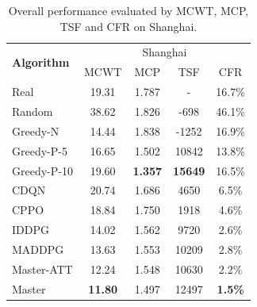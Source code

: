 \documentclass[sigconf]{acmart}
\newcommand{\beijing}{{\sc Beijing}\xspace}
\newcommand{\shanghai}{{\sc Shanghai}\xspace}
\newcommand{\stddpg}{{\sc Master}\xspace}
\begin{document}
\begin{table}[htb]
	\centering
	\caption{Overall performance evaluated by MCWT, MCP, TSF and CFR on \shanghai.}
	\vspace{-2mm}
	\begin{tabular}{lcccc}
		\toprule[0.8pt]
		\multirow{2}{*}{\textbf{Algorithm}} & \multicolumn{4}{c}{\shanghai} \\ \cline{2-5}
		& MCWT & MCP & TSF & CFR \\ 
		\midrule[0.5pt]
		Real &   19.31 & 1.787 & - & 16.7\% \\
		Random &   38.62 & 1.826 & -698 & 46.1\% \\
		Greedy-N &  14.44 & 1.838 & -1252 & 16.9\%  \\
		Greedy-P-5 &  16.65 & 1.502 & 10842 & 13.8\% \\
		Greedy-P-10 & 19.60 & \textbf{1.357} & \textbf{15649} & 16.5\% \\
		CDQN & 20.74 & 1.686 & 4650 & 6.5\% \\
		CPPO & 18.84 & 1.750 & 1918 & 4.6\%\\
		IDDPG & 14.02 & 1.562 & 9720 & 2.6\%\\
		MADDPG & 13.63 & 1.553 & 10209 & 2.8\%\\
        \midrule[0.5pt]
		\stddpg-ATT & 12.24 & 1.548 & 10630 & 2.2\%\\
		\stddpg & \textbf{11.80} & 1.497 & 12497 & \textbf{1.5\%}\\
		\bottomrule[0.5pt]
	\end{tabular}
	\label{table:overall_shanghai}
\end{table}

\end{document}

